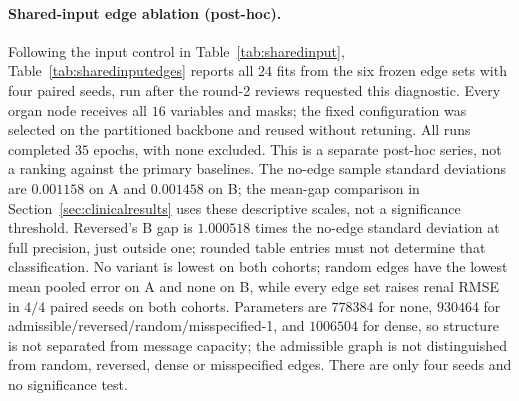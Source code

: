 \paragraph{Shared-input edge ablation (post-hoc).}\label{app:sharedinputedges}
Following the input control in Table~\ref{tab:sharedinput}, Table~\ref{tab:sharedinputedges} reports all $24$ fits from the six frozen edge sets with four paired seeds, run after the round-2 reviews requested this diagnostic. Every organ node receives all $16$ variables and masks; the fixed configuration was selected on the partitioned backbone and reused without retuning. All runs completed $35$ epochs, with none excluded. This is a separate post-hoc series, not a ranking against the primary baselines. The no-edge sample standard deviations are $0.001158$ on A and $0.001458$ on B; the mean-gap comparison in Section~\ref{sec:clinicalresults} uses these descriptive scales, not a significance threshold. Reversed's B gap is $1.000518$ times the no-edge standard deviation at full precision, just outside one; rounded table entries must not determine that classification. No variant is lowest on both cohorts; random edges have the lowest mean pooled error on A and none on B, while every edge set raises renal RMSE in $4/4$ paired seeds on both cohorts. Parameters are $778384$ for none, $930464$ for admissible/reversed/random/misspecified-1, and $1006504$ for dense, so structure is not separated from message capacity; the admissible graph is not distinguished from random, reversed, dense or misspecified edges. There are only four seeds and no significance test.

